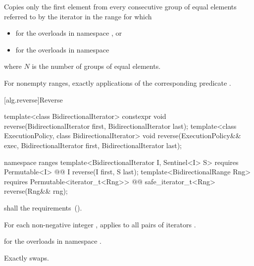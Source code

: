\begin{itemdescr}
\pnum
\effects
Copies only the first element from every consecutive group of equal elements referred to by
the iterator
in the range
for which 

\pnum
\returns
{}
\begin{newnewblock}
\begin{itemize}
\item {} for the overloads in namespace , or
\item {} for the overloads in namespace 
\end{itemize}
where $N$ is the number of groups of equal elements.
\end{newnewblock}

\pnum
\complexity
For nonempty ranges, exactly
applications of the corresponding predicate
.
\end{itemdescr}


[alg.reverse]{Reverse}

%
\begin{itemdecl}
template<class BidirectionalIterator>
  constexpr void reverse(BidirectionalIterator first, BidirectionalIterator last);
template<class ExecutionPolicy, class BidirectionalIterator>
  void reverse(ExecutionPolicy&& exec,
               BidirectionalIterator first, BidirectionalIterator last);
\end{itemdecl}
\begin{addedblock}
\begin{itemdecl}
namespace ranges {
  template<BidirectionalIterator I, Sentinel<I> S>
    requires Permutable<I>
    @@ I reverse(I first, S last);
  template<BidirectionalRange Rng>
    requires Permutable<iterator_t<Rng>>
    @@ safe_iterator_t<Rng> reverse(Rng&& rng);
}
\end{itemdecl}
\end{addedblock}

\begin{itemdescr}
\pnum
\requires
{}
 shall   the
 requirements~().

\pnum
\effects
For each non-negative integer
,
applies
to all pairs of iterators
.

\begin{newnewblock}
\pnum
\returns
{} for the overloads in namespace .
\end{newnewblock}

\pnum
\complexity
Exactly
swaps.
\end{itemdescr}


